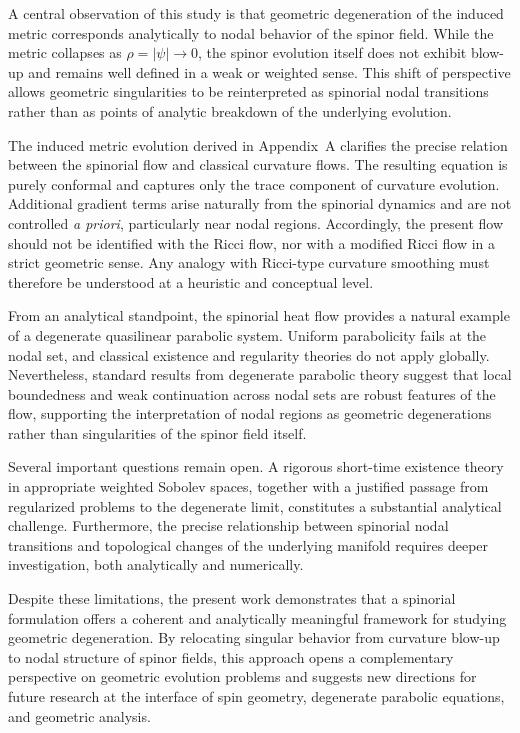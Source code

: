 \documentclass[11pt, reqno, a4paper]{amsart}
\theoremstyle{definition}
\theoremstyle{remark}
\begin{document}
A central observation of this study is that geometric degeneration of the induced
metric corresponds analytically to nodal behavior of the spinor field.
While the metric collapses as $\rho = |\psi| \to 0$, the spinor evolution itself
does not exhibit blow-up and remains well defined in a weak or weighted sense.
This shift of perspective allows geometric singularities to be reinterpreted as
spinorial nodal transitions rather than as points of analytic breakdown of the
underlying evolution.

The induced metric evolution derived in Appendix~A clarifies the precise relation
between the spinorial flow and classical curvature flows.
The resulting equation is purely conformal and captures only the trace component
of curvature evolution.
Additional gradient terms arise naturally from the spinorial dynamics and are not
controlled \emph{a priori}, particularly near nodal regions.
Accordingly, the present flow should not be identified with the Ricci flow, nor
with a modified Ricci flow in a strict geometric sense.
Any analogy with Ricci-type curvature smoothing must therefore be understood at a
heuristic and conceptual level.

From an analytical standpoint, the spinorial heat flow provides a natural example
of a degenerate quasilinear parabolic system.
Uniform parabolicity fails at the nodal set, and classical existence and regularity
theories do not apply globally.
Nevertheless, standard results from degenerate parabolic theory suggest that local
boundedness and weak continuation across nodal sets are robust features of the
flow, supporting the interpretation of nodal regions as geometric degenerations
rather than singularities of the spinor field itself.

Several important questions remain open.
A rigorous short-time existence theory in appropriate weighted Sobolev spaces,
together with a justified passage from regularized problems to the degenerate
limit, constitutes a substantial analytical challenge.
Furthermore, the precise relationship between spinorial nodal transitions and
topological changes of the underlying manifold requires deeper investigation,
both analytically and numerically.

Despite these limitations, the present work demonstrates that a spinorial
formulation offers a coherent and analytically meaningful framework for studying
geometric degeneration.
By relocating singular behavior from curvature blow-up to nodal structure of
spinor fields, this approach opens a complementary perspective on geometric
evolution problems and suggests new directions for future research at the
interface of spin geometry, degenerate parabolic equations, and geometric analysis.
\end{document}
